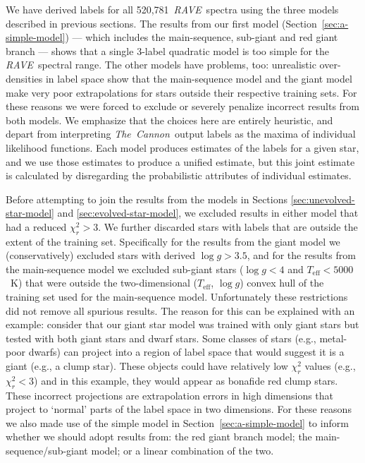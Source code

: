 \documentclass[preprint]{aastex61}
\newcommand{\acronym}[1]{{\small{#1}}}
\newcommand{\project}[1]{\textsl{#1}}
\newcommand{\thecannon}{\project{The~Cannon}}
\newcommand{\rave}{\project{\acronym{RAVE}}}
\newcommand{\teff}{T_{\mathrm{eff}}}
\newcommand{\logg}{\log g}
\newcommand{\Nspectra}{520,781}
\begin{document}
We have derived labels for all \Nspectra\ \rave\ spectra using the three models
described in previous sections.  The results from our first model 
(Section~\ref{sec:a-simple-model}) --- which includes the main-sequence, sub-giant 
and red giant branch --- shows that a single 3-label quadratic model is too simple 
for the \rave\ spectral range.   The other models have problems, too: unrealistic 
over-densities in label space show that the main-sequence model and the giant model
make very poor extrapolations for stars outside their respective training sets.  
For these reasons we were forced to exclude or severely penalize incorrect results
from both models.  We emphasize that the choices here are entirely heuristic, 
and depart from interpreting \thecannon\ output labels as the maxima of individual 
likelihood functions.  Each model produces estimates of the labels for a given star, 
and we use those estimates to produce a unified estimate, but this joint estimate 
is calculated by disregarding the probabilistic attributes of individual estimates.


Before attempting to join the results from the models in Sections 
\ref{sec:unevolved-star-model} and \ref{sec:evolved-star-model}, we excluded results
in either model that had a reduced $\chi_{r}^2 > 3$.  We further discarded stars with
labels that are outside the extent of the training set.  Specifically for the
results from the giant model we (conservatively) excluded stars with derived 
$\logg > 3.5$, and for the results from the main-sequence model we excluded 
sub-giant stars ($\logg < 4$ and $\teff < 5000$~K) that were outside the two-dimensional 
($\teff$, $\logg$) convex hull of the training set used for the main-sequence model.  
Unfortunately these restrictions did not remove all spurious results.  The reason 
for this can be explained with an example:  consider that our giant star model was 
trained with only giant stars but tested with both giant stars and dwarf stars.  
Some classes of stars (e.g., metal-poor dwarfs) can project into a region of label 
space that would suggest it is a giant (e.g., a clump star).  These objects could 
have relatively low $\chi_{r}^2$ values (e.g., $\chi_{r}^2 < 3$) and in this example,
they would appear as bonafide red clump stars.  These incorrect projections are 
extrapolation errors in high dimensions that project to `normal' parts of the label 
space in two dimensions.  For these reasons we also made use of the simple model in 
Section~\ref{sec:a-simple-model} to inform whether we should adopt results from: 
the red giant branch model; the main-sequence/sub-giant model; or a linear combination 
of the two. 
\end{document}
